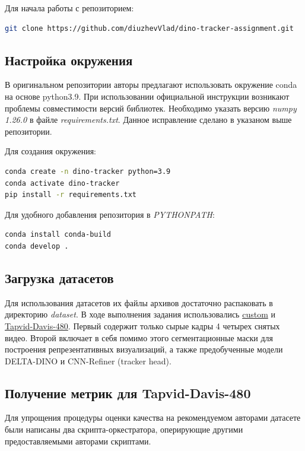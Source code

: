 \documentclass[a4paper, 14pt]{extarticle}
\theoremstyle{definition}
\theoremstyle{plain}
\theoremstyle{remark}
\begin{document}
Для начала работы с репозиторием:
\lstset{style=mystyle}
\begin{lstlisting}[language=bash]
git clone https://github.com/diuzhevVlad/dino-tracker-assignment.git
\end{lstlisting}

\subsection{Настройка окружения}
В оригинальном репозитории авторы предлагают использовать окружение conda на основе python3.9. При использовании официальной инструкции возникают проблемы совместимости версий библиотек. Необходимо указать версию \textit{numpy 1.26.0} в файле \textit{requirements.txt}. Данное исправление сделано в указаном выше репозитории.

Для создания окружения:
\lstset{style=mystyle}
\begin{lstlisting}[language=bash]
conda create -n dino-tracker python=3.9 
conda activate dino-tracker 
pip install -r requirements.txt
\end{lstlisting}

Для удобного добавления репозитория в \textit{PYTHONPATH}:
\begin{lstlisting}[language=bash]
conda install conda-build
conda develop .
\end{lstlisting}

\subsection{Загрузка датасетов}
Для использования датасетов их файлы архивов достаточно распаковать в директорию \textit{dataset}. В ходе выполнения задания использовались \href{https://drive.google.com/file/d/15iur2U_639eWnykylz69-RPGT6p3Ip8u/view?usp=drive_link}{custom} и \href{https://www.dropbox.com/scl/fo/7s2rgsm92qbzzh2xnx51d/AIvXxRaJPL2RQm43Zi_taJU?e=1&preview=davis_480.zip&rlkey=6cs0bm2u0on1u7z0jyxlq8avq&st=7s75r77a&dl=0}{Tapvid-Davis-480}. Первый содержит только сырые кадры 4 четырех снятых видео. Второй включает в себя помимо этого сегментационные маски для построения репрезентативных визуализаций, а также предобученные модели DELTA-DINO и CNN-Refiner (tracker head).

\subsection{Получение метрик для Tapvid-Davis-480}
Для упрощения процедуры оценки качества на рекомендуемом авторами датасете были написаны два скрипта-оркестратора, оперирующие другими предоставляемыми авторами скриптами.
\end{document}
